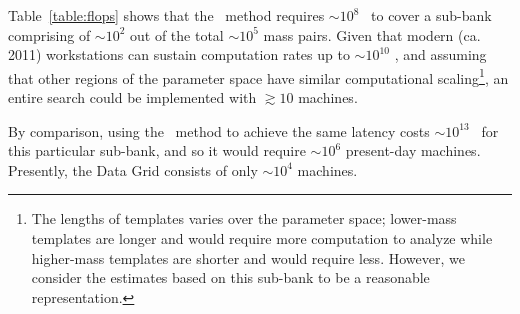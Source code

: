 Table~\ref{table:flops} shows that the \lloid\ method requires $\sim 10^8$
\flops\ to cover a sub-bank comprising of $\sim 10^2$ out of the total $\sim
10^5$ mass pairs.  Given that modern (ca. 2011) workstations can sustain
computation rates up to $\sim 10^{10}$ \flops{}, and assuming that other
regions of the parameter space have similar computational scaling\footnote{The
lengths of templates varies over the parameter space; lower-mass templates are
longer and would require more computation to analyze while higher-mass
templates are shorter and would require less. However, we consider the
estimates based on this sub-bank to be a reasonable representation.}, an entire
search could be implemented with $\gtrsim 10$ machines.

By comparison, using the \TD\ method to achieve the same latency costs $\sim 10^{13}$ \flops\ for this particular sub-bank, and so it would require $\sim 10^6$ present-day machines.  Presently, the \LIGO{} Data Grid consists of only $\sim 10^4$ machines.



